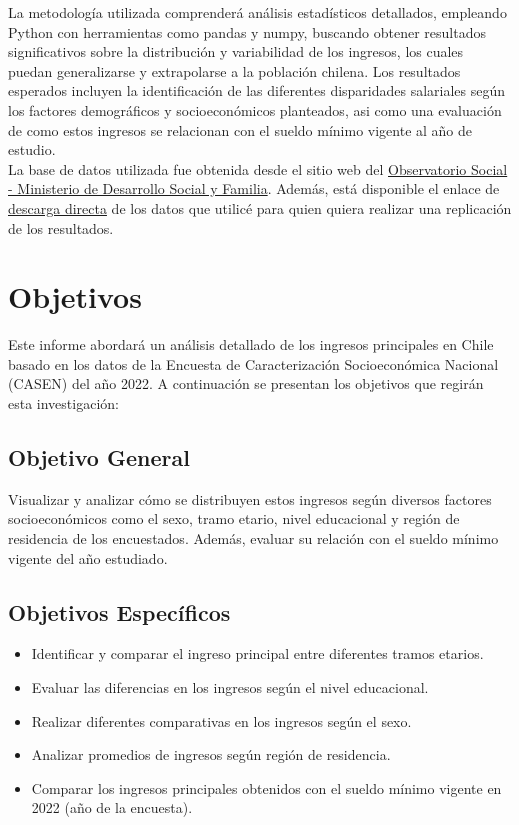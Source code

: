 \documentclass{article}
\begin{document}
	La metodología utilizada comprenderá análisis estadísticos detallados, empleando Python con herramientas como pandas y numpy, buscando obtener resultados significativos sobre la distribución y variabilidad de los ingresos, los cuales puedan generalizarse y extrapolarse a la población chilena. Los resultados esperados incluyen la identificación de las diferentes disparidades salariales según los factores demográficos y socioeconómicos planteados, asi como una evaluación de como estos ingresos se relacionan con el sueldo mínimo vigente al año de estudio.\\
	
	La base de datos utilizada fue obtenida desde el sitio web del \href{https://observatorio.ministeriodesarrollosocial.gob.cl/encuesta-casen-2022}{Observatorio Social - Ministerio de Desarrollo Social y Familia}. Además, está disponible el enlace de  \href{https://observatorio.ministeriodesarrollosocial.gob.cl/storage/docs/casen/2022/Base%20de%20datos%20Casen%202022%20SPSS_18%20marzo%202024.sav.zip}{descarga directa} de los datos que utilicé para quien quiera realizar una replicación de los resultados.
	
	\section*{Objetivos}
	
	Este informe abordará un análisis detallado de los ingresos principales en Chile basado en los datos de la Encuesta de Caracterización Socioeconómica Nacional (CASEN) del año 2022. A continuación se presentan los objetivos que regirán esta investigación:
	
	\subsection*{Objetivo General}

	Visualizar y analizar cómo se distribuyen estos ingresos según diversos factores socioeconómicos como el sexo, tramo etario, nivel educacional y región de residencia de los encuestados. Además, evaluar su relación con el sueldo mínimo vigente del año estudiado.

	\subsection*{Objetivos Específicos}
	
	\begin{itemize}
		\item Identificar y comparar el ingreso principal entre diferentes tramos etarios.
		\item Evaluar las diferencias en los ingresos según el nivel educacional.
		\item Realizar diferentes comparativas en los ingresos según el sexo.
		\item Analizar promedios de ingresos según región de residencia.
		\item Comparar los ingresos principales obtenidos con el sueldo mínimo vigente en 2022 (año de la encuesta).
	\end{itemize}
	
\end{document}
